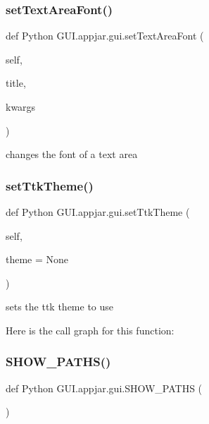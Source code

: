 \begin{DoxyVerb}
\subsubsection{\texorpdfstring{set\+Text\+Area\+Font()}{setTextAreaFont()}}
{\footnotesize\ttfamily def Python G\+U\+I.\+appjar.\+gui.\+set\+Text\+Area\+Font (\begin{DoxyParamCaption}\item[{}]{self,  }\item[{}]{title,  }\item[{}]{kwargs }\end{DoxyParamCaption})}

\begin{DoxyVerb}changes the font of a text area \end{DoxyVerb}
 \mbox{\label{class_python_01_g_u_i_1_1appjar_1_1gui_a8a81af58d70660baa19979087d024f73}} 
\subsubsection{\texorpdfstring{set\+Ttk\+Theme()}{setTtkTheme()}}
{\footnotesize\ttfamily def Python G\+U\+I.\+appjar.\+gui.\+set\+Ttk\+Theme (\begin{DoxyParamCaption}\item[{}]{self,  }\item[{}]{theme = {\ttfamily None} }\end{DoxyParamCaption})}

\begin{DoxyVerb}sets the ttk theme to use \end{DoxyVerb}
 Here is the call graph for this function\+:
\mbox{\label{class_python_01_g_u_i_1_1appjar_1_1gui_ae33437e9a0eca7e32c536fd2fca9bb45}} 
\subsubsection{\texorpdfstring{S\+H\+O\+W\+\_\+\+P\+A\+T\+H\+S()}{SHOW\_PATHS()}}
{\footnotesize\ttfamily def Python G\+U\+I.\+appjar.\+gui.\+S\+H\+O\+W\+\_\+\+P\+A\+T\+HS (\begin{DoxyParamCaption}{ }\end{DoxyParamCaption})\hspace{0.3cm}{\ttfamily [static]}}


\end{DoxyVerb}
